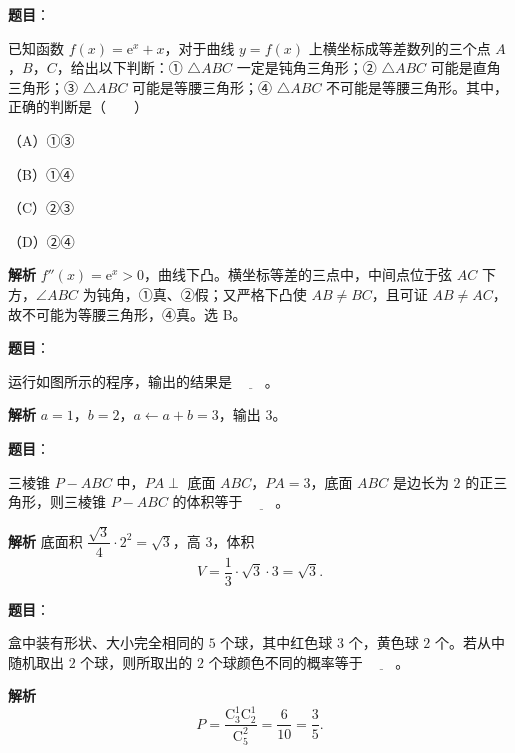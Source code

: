 \begin{answer}

\textbf{题目}：

已知函数 $f(x)=\mathrm e^x+x$，对于曲线 $y=f(x)$ 上横坐标成等差数列的三个点 $A$，$B$，$C$，给出以下判断：① $\triangle ABC$ 一定是钝角三角形；② $\triangle ABC$ 可能是直角三角形；③ $\triangle ABC$ 可能是等腰三角形；④ $\triangle ABC$ 不可能是等腰三角形。其中，正确的判断是\mbox{（　　）}

（A）①③

（B）①④

（C）②③

（D）②④

\textbf{解析}
$f''(x)=\mathrm e^x>0$，曲线下凸。横坐标等差的三点中，中间点位于弦 $AC$ 下方，$\angle ABC$ 为钝角，①真、②假；又严格下凸使 $AB\ne BC$，且可证 $AB\ne AC$，故不可能为等腰三角形，④真。选 B。


\end{answer}
\begin{answer}

\textbf{题目}：

运行如图所示的程序，输出的结果是 $\underline{\qquad}$。
\nopagebreak[4]
\begin{center}\end{center}
\nopagebreak[4]
\textbf{解析}
$a=1$，$b=2$，$a\leftarrow a+b=3$，输出 $3$。


\end{answer}
\begin{answer}

\textbf{题目}：

三棱锥 $P-ABC$ 中，$PA\perp$ 底面 $ABC$，$PA=3$，底面 $ABC$ 是边长为 $2$ 的正三角形，则三棱锥 $P-ABC$ 的体积等于 $\underline{\qquad}$。

\textbf{解析}
底面积 $\dfrac{\sqrt3}4\cdot2^2=\sqrt3$，高 $3$，体积
\nopagebreak[4]
\[V=\frac13\cdot\sqrt3\cdot3=\sqrt3.\]


\end{answer}
\begin{answer}

\textbf{题目}：

盒中装有形状、大小完全相同的 $5$ 个球，其中红色球 $3$ 个，黄色球 $2$ 个。若从中随机取出 $2$ 个球，则所取出的 $2$ 个球颜色不同的概率等于 $\underline{\qquad}$。

\textbf{解析}
\nopagebreak[4]
\[P=\frac{\mathrm C_3^1\mathrm C_2^1}{\mathrm C_5^2}=\frac6{10}=\frac35.\]


\end{answer}
